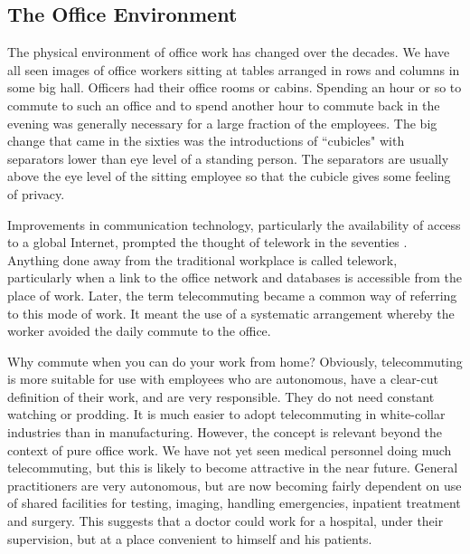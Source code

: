 \begin{multicols}{2}

\section{The Office Environment}\label{section-1}

\vspace{-.3cm}

The physical environment of office work has changed over the decades. We have all seen images of office workers sitting at tables arranged in rows and columns in some big hall. Officers had their office rooms or cabins. Spending an hour or so to commute to such an office and to spend another hour to commute back in the evening was generally necessary for a large fraction of the employees. The big change that came in the sixties was the introductions of ``cubicles" with separators lower than eye level of a standing person. The separators are usually above the eye level of the sitting employee so that the cubicle gives some feeling of privacy.

Improvements in communication technology, particularly the availability of access to a global Internet, prompted the thought of telework in the seventies \cite{art3-key01}. Anything done away from the traditional workplace is called telework, particularly when a link to the office network and databases is accessible from the place of work. Later, the term telecommuting became a common way of referring to this mode of work. It meant the use of a systematic arrangement whereby the worker avoided the daily commute to the office. 

Why commute when you can do your work from home? Obviously, telecommuting is more suitable for use with employees who are autonomous, have a clear-cut definition of their work, and are very responsible. They do not need constant watching or prodding. It is much easier to adopt telecommuting in white-collar industries than in manufacturing. However, the concept is relevant beyond the context of pure office work. We have not yet seen medical personnel doing much telecommuting, but this is likely to become attractive in the near future. General practitioners are very autonomous, but are now becoming fairly dependent on use of shared facilities for testing, imaging, handling emergencies, inpatient treatment and surgery. This suggests that a doctor could work for a hospital, under their supervision, but at a place convenient to himself and his patients.


\end{multicols}
